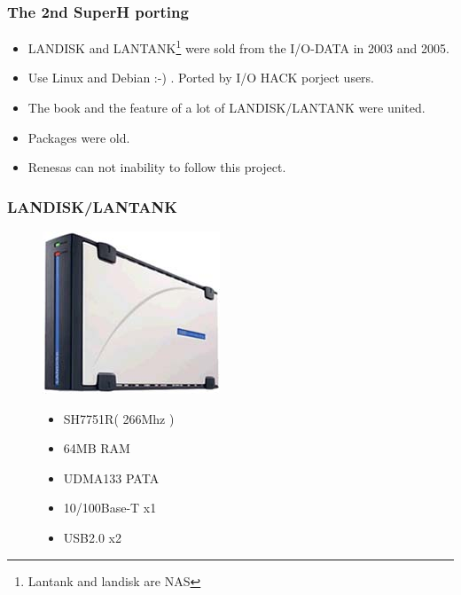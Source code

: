 \documentclass[cjk,dvipdfmx,12pt]{beamer}
\begin{document}
\begin{frame}
 \frametitle{The 2nd SuperH porting}
  \begin{itemize}
    \item LANDISK and LANTANK\footnote{Lantank and landisk are NAS} were sold from the I/O-DATA in 2003 and 2005.
    \item Use Linux and Debian :-) . Ported by I/O HACK porject users.
    \item The book and the feature of a lot of LANDISK/LANTANK were united. 
    \item Packages were old.
    \item Renesas can not inability to follow this project.
  \end{itemize}
\end{frame}


\begin{frame}
 \frametitle{LANDISK/LANTANK}

\begin{figure}
 \begin{minipage}[t]{0.6\hsize}
   \includegraphics[width=0.5\hsize]{image200705/landisk00.jpg}
 \end{minipage}
 \begin{minipage}[t]{0.5\hsize}
  \begin{itemize}
   \item SH7751R( 266Mhz )
   \item 64MB RAM
   \item UDMA133 PATA 
   \item 10/100Base-T x1
   \item USB2.0 x2 
  \end{itemize}
 \end{minipage}
\end{figure}
\end{frame}
\end{document}
